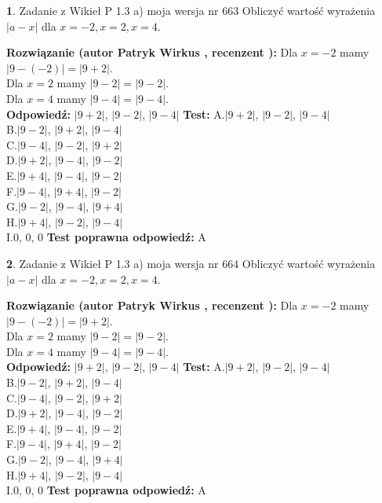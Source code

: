 \documentclass[12pt, a4paper]{article}
\theoremstyle{definition} %
\newtheorem{zad}{}
\newcommand{\zadStart}[1]{\begin{zad}#1\newline}
\newcommand{\zadStop}{\end{zad}}
\newcommand{\rozwStart}[2]{\noindent \textbf{Rozwiązanie (autor #1 , recenzent #2): }\newline}
\newcommand{\rozwStop}{\newline}
\newcommand{\odpStart}{\noindent \textbf{Odpowiedź:}\newline}
\newcommand{\odpStop}{\newline}
\newcommand{\testStart}{\noindent \textbf{Test:}\newline}
\newcommand{\testStop}{\newline}
\newcommand{\kluczStart}{\noindent \textbf{Test poprawna odpowiedź:}\newline}
\newcommand{\kluczStop}{\newline}
\begin{document}
\zadStart{Zadanie z Wikieł P 1.3 a) moja wersja nr 663}
Obliczyć wartość wyrażenia $|a - x|$ dla $x=-2,x=2,x=4$.
\zadStop
\rozwStart{Patryk Wirkus}{}
Dla $x = -2$ mamy $|9 - (-2)| = |9 + 2|$.\\
Dla $x = 2$ mamy $|9 - 2| = |9 - 2|$.\\
Dla $x = 4$ mamy $|9 - 4| = |9 - 4|$.\\
\rozwStop
\odpStart
$|9 + 2|$, $|9 - 2|$, $|9 - 4|$
\odpStop
\testStart
A.$|9 + 2|$, $|9 - 2|$, $|9 - 4|$\\
B.$|9 - 2|$, $|9 + 2|$, $|9 - 4|$\\
C.$|9 - 4|$, $|9 - 2|$, $|9 + 2|$\\
D.$|9 + 2|$, $|9 - 4|$, $|9 - 2|$\\
E.$|9 + 4|$, $|9 - 4|$, $|9 - 2|$\\
F.$|9 - 4|$, $|9 + 4|$, $|9 - 2|$\\
G.$|9 - 2|$, $|9 - 4|$, $|9 + 4|$\\
H.$|9 + 4|$, $|9 - 2|$, $|9 - 4|$\\
I.$0$, $0$, $0$
\testStop
\kluczStart
A
\kluczStop



\zadStart{Zadanie z Wikieł P 1.3 a) moja wersja nr 664}
Obliczyć wartość wyrażenia $|a - x|$ dla $x=-2,x=2,x=4$.
\zadStop
\rozwStart{Patryk Wirkus}{}
Dla $x = -2$ mamy $|9 - (-2)| = |9 + 2|$.\\
Dla $x = 2$ mamy $|9 - 2| = |9 - 2|$.\\
Dla $x = 4$ mamy $|9 - 4| = |9 - 4|$.\\
\rozwStop
\odpStart
$|9 + 2|$, $|9 - 2|$, $|9 - 4|$
\odpStop
\testStart
A.$|9 + 2|$, $|9 - 2|$, $|9 - 4|$\\
B.$|9 - 2|$, $|9 + 2|$, $|9 - 4|$\\
C.$|9 - 4|$, $|9 - 2|$, $|9 + 2|$\\
D.$|9 + 2|$, $|9 - 4|$, $|9 - 2|$\\
E.$|9 + 4|$, $|9 - 4|$, $|9 - 2|$\\
F.$|9 - 4|$, $|9 + 4|$, $|9 - 2|$\\
G.$|9 - 2|$, $|9 - 4|$, $|9 + 4|$\\
H.$|9 + 4|$, $|9 - 2|$, $|9 - 4|$\\
I.$0$, $0$, $0$
\testStop
\kluczStart
A
\kluczStop
\end{document}
